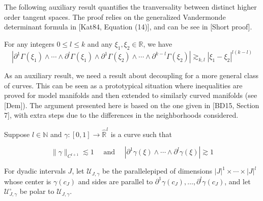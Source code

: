 The following auxiliary result quantifies the tranversality between distinct higher order tangent spaces. The proof relies on the generalized Vandermonde
determinant formula in [Kat84, Equation (14)], and can be see in [Short proof].

\begin{lem}
For any integers $0 \leqslant l \leqslant k$ and any $\xi_{1}, \xi_{2} \in \mathbb{R}$, we have
    \begin{equation*}
    \left|\partial^{1} \Gamma\left(\xi_{1}\right) \wedge \cdots \wedge \partial^{l} \Gamma\left(\xi_{1}\right) \wedge \partial^{1} \Gamma\left(\xi_{2}\right) \wedge \cdots \wedge \partial^{k-l} \Gamma\left(\xi_{2}\right)\right| \gtrsim_{k, l}\left|\xi_{1}-\xi_{2}\right|^{l(k-l)} \tag{3.6}
    \end{equation*}
\end{lem}

As an auxiliary result, we need a result about decoupling for a more general class of curves.
 This can be seen as a prototypical situation where inequalities are proved for model manifolds and then extended to similarly 
 curved manifolds (see [Dem]). The argument presented here is based on the one given in [BD15, Section 7], 
 with extra steps due to the differences in the neighborhoods considered.

 Suppose $l \in \mathbb{N}$ and $\gamma:[0,1] \rightarrow \hat{\mathbb{R}}^{l}$ is a curve such that


 \begin{equation*}
 \|\gamma\|_{C^{l+1}} \lesssim 1 \quad \text { and } \quad\left|\partial^{1} \gamma(\xi) \wedge \cdots \wedge \partial^{l} \gamma(\xi)\right| \gtrsim 1 \tag{3.7}
 \end{equation*}
 
 For dyadic intervals $J$, let $\mathcal{U}_{J, \gamma}$ be the parallelepiped of dimensions $|J|^{1} \times \cdots \times|J|^{l}$
  whose center is $\gamma\left(c_{J}\right)$ and sides are parallel to
   $\partial^{1} \gamma\left(c_{J}\right), \ldots, \partial^{l} \gamma\left(c_{J}\right)$, 
   and let $\mathcal{U}_{J, \gamma}^{\circ}$ be polar to $\mathcal{U}_{J, \gamma}$.


